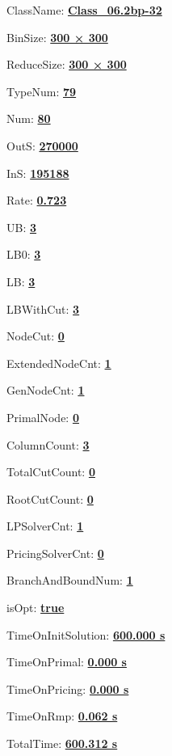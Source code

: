 \documentclass[11pt]{article}
\begin{document}
\pagestyle{empty}


ClassName: \underline{\textbf{Class_06.2bp-32}}
\par
BinSize: \underline{\textbf{300 × 300}}
\par
ReduceSize: \underline{\textbf{300 × 300}}
\par
TypeNum: \underline{\textbf{79}}
\par
Num: \underline{\textbf{80}}
\par
OutS: \underline{\textbf{270000}}
\par
InS: \underline{\textbf{195188}}
\par
Rate: \underline{\textbf{0.723}}
\par
UB: \underline{\textbf{3}}
\par
LB0: \underline{\textbf{3}}
\par
LB: \underline{\textbf{3}}
\par
LBWithCut: \underline{\textbf{3}}
\par
NodeCut: \underline{\textbf{0}}
\par
ExtendedNodeCnt: \underline{\textbf{1}}
\par
GenNodeCnt: \underline{\textbf{1}}
\par
PrimalNode: \underline{\textbf{0}}
\par
ColumnCount: \underline{\textbf{3}}
\par
TotalCutCount: \underline{\textbf{0}}
\par
RootCutCount: \underline{\textbf{0}}
\par
LPSolverCnt: \underline{\textbf{1}}
\par
PricingSolverCnt: \underline{\textbf{0}}
\par
BranchAndBoundNum: \underline{\textbf{1}}
\par
isOpt: \underline{\textbf{true}}
\par
TimeOnInitSolution: \underline{\textbf{600.000 s}}
\par
TimeOnPrimal: \underline{\textbf{0.000 s}}
\par
TimeOnPricing: \underline{\textbf{0.000 s}}
\par
TimeOnRmp: \underline{\textbf{0.062 s}}
\par
TotalTime: \underline{\textbf{600.312 s}}
\par
\newpage
\end{document}
